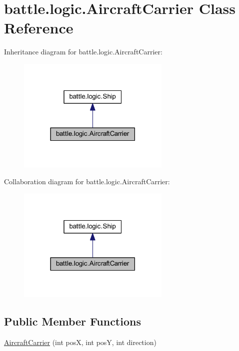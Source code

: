 \hypertarget{classbattle_1_1logic_1_1_aircraft_carrier}{}\section{battle.\+logic.\+Aircraft\+Carrier Class Reference}
\label{classbattle_1_1logic_1_1_aircraft_carrier}


Inheritance diagram for battle.\+logic.\+Aircraft\+Carrier\+:
\nopagebreak
\begin{figure}[H]
\begin{center}
\leavevmode
\includegraphics[width=206pt]{classbattle_1_1logic_1_1_aircraft_carrier__inherit__graph}
\end{center}
\end{figure}


Collaboration diagram for battle.\+logic.\+Aircraft\+Carrier\+:
\nopagebreak
\begin{figure}[H]
\begin{center}
\leavevmode
\includegraphics[width=206pt]{classbattle_1_1logic_1_1_aircraft_carrier__coll__graph}
\end{center}
\end{figure}
\subsection*{Public Member Functions}
\begin{DoxyCompactItemize}
\item 
\hyperlink{classbattle_1_1logic_1_1_aircraft_carrier_aa5045d520a27b2b1e514885356eee6ad}{Aircraft\+Carrier} (int pos\+X, int pos\+Y, int direction)
\end{DoxyCompactItemize}


